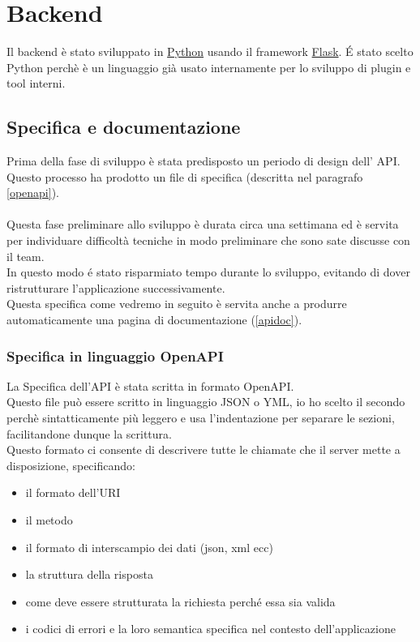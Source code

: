 \chapter{Backend}
        Il backend è stato sviluppato in \href{https://www.python.org}{Python} usando il framework \href{https://flask.palletsprojects.com/en/1.1.x/}{Flask}.
        \'E stato scelto Python perchè è un linguaggio già usato internamente per lo sviluppo di plugin e tool interni.

        \section{Specifica e documentazione}
            Prima della fase di sviluppo è stata predisposto un periodo di design dell' API.\\
            Questo processo ha prodotto un file di specifica (descritta nel paragrafo 
            \ref{openapi}).\\\\
            Questa fase preliminare allo sviluppo è durata circa una settimana ed è servita per 
            individuare difficoltà tecniche in modo preliminare che sono sate discusse con il team.\\
            In questo modo \'e stato risparmiato tempo durante lo sviluppo, evitando di dover ristrutturare l'applicazione successivamente.\\
            Questa specifica come vedremo in seguito è servita anche a produrre automaticamente una pagina di documentazione (\ref{apidoc}).
            
            \subsection{Specifica in linguaggio OpenAPI\label{openapi}}
                La Specifica dell'API è stata scritta in formato OpenAPI.\\
                Questo file può essere scritto in linguaggio JSON o YML, io ho scelto il secondo perchè
                sintatticamente più leggero e usa l'indentazione per separare le sezioni, facilitandone dunque la scrittura. \\
                Questo formato ci consente di descrivere tutte le chiamate che il server 
                mette a disposizione, specificando:
                \begin{itemize}
                    \item il formato dell'URI 
                    \item il metodo
                    \item il formato di interscampio dei dati (json, xml ecc) 
                    \item la struttura della risposta
                    \item come deve essere strutturata la richiesta perch\'e essa sia valida
                        \item i codici di errori e la loro semantica specifica nel contesto dell'applicazione
                \end{itemize}
                
